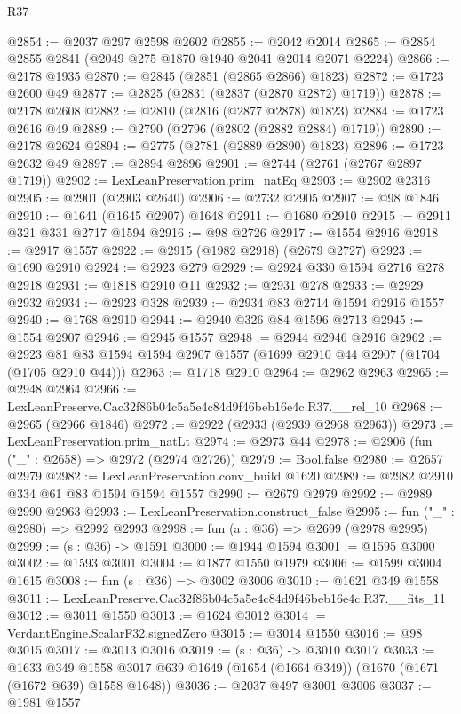 \begin{lexlean}{R37}
\begin{coremodule}
@2854 := @2037 @297 @2598 @2602
@2855 := @2042 @2014
@2865 := @2854 @2855 @2841 (@2049 @275 @1870 @1940 @2041 @2014 @2071 @2224)
@2866 := @2178 @1935
@2870 := @2845 (@2851 (@2865 @2866) @1823)
@2872 := @1723 @2600 @49
@2877 := @2825 (@2831 (@2837 (@2870 @2872) @1719))
@2878 := @2178 @2608
@2882 := @2810 (@2816 (@2877 @2878) @1823)
@2884 := @1723 @2616 @49
@2889 := @2790 (@2796 (@2802 (@2882 @2884) @1719))
@2890 := @2178 @2624
@2894 := @2775 (@2781 (@2889 @2890) @1823)
@2896 := @1723 @2632 @49
@2897 := @2894 @2896
@2901 := @2744 (@2761 (@2767 @2897 @1719))
@2902 := LexLeanPreservation.prim_natEq
@2903 := @2902 @2316
@2905 := @2901 (@2903 @2640)
@2906 := @2732 @2905
@2907 := @98 @1846
@2910 := @1641 (@1645 @2907) @1648
@2911 := @1680 @2910
@2915 := @2911 @321 @331 @2717 @1594
@2916 := @98 @2726
@2917 := @1554 @2916
@2918 := @2917 @1557
@2922 := @2915 (@1982 @2918) (@2679 @2727)
@2923 := @1690 @2910
@2924 := @2923 @279
@2929 := @2924 @330 @1594 @2716 @278 @2918
@2931 := @1818 @2910 @11
@2932 := @2931 @278
@2933 := @2929 @2932
@2934 := @2923 @328
@2939 := @2934 @83 @2714 @1594 @2916 @1557
@2940 := @1768 @2910
@2944 := @2940 @326 @84 @1596 @2713
@2945 := @1554 @2907
@2946 := @2945 @1557
@2948 := @2944 @2946 @2916
@2962 := @2923 @81 @83 @1594 @1594 @2907 @1557 (@1699 @2910 @44 @2907 (@1704 (@1705 @2910 @44)))
@2963 := @1718 @2910
@2964 := @2962 @2963
@2965 := @2948 @2964
@2966 := LexLeanPreserve.Cac32f86b04c5a5e4c84d9f46beb16e4c.R37.__rel_10
@2968 := @2965 (@2966 @1846)
@2972 := @2922 (@2933 (@2939 @2968 @2963))
@2973 := LexLeanPreservation.prim_natLt
@2974 := @2973 @44
@2978 := @2906 (fun ("_" : @2658) => @2972 (@2974 @2726))
@2979 := Bool.false
@2980 := @2657 @2979
@2982 := LexLeanPreservation.conv_build @1620
@2989 := @2982 @2910 @334 @61 @83 @1594 @1594 @1557
@2990 := @2679 @2979
@2992 := @2989 @2990 @2963
@2993 := LexLeanPreservation.construct_false
@2995 := fun ("_" : @2980) => @2992 @2993
@2998 := fun (a : @36) => @2699 (@2978 @2995)
@2999 := (s : @36) -> @1591
@3000 := @1944 @1594
@3001 := @1595 @3000
@3002 := @1593 @3001
@3004 := @1877 @1550 @1979
@3006 := @1599 @3004 @1615
@3008 := fun (s : @36) => @3002 @3006
@3010 := @1621 @349 @1558
@3011 := LexLeanPreserve.Cac32f86b04c5a5e4c84d9f46beb16e4c.R37.__fits_11
@3012 := @3011 @1550
@3013 := @1624 @3012
@3014 := VerdantEngine.ScalarF32.signedZero
@3015 := @3014 @1550
@3016 := @98 @3015
@3017 := @3013 @3016
@3019 := (s : @36) -> @3010 @3017
@3033 := @1633
    @349
    @1558
    @3017
    @639
    @1649
    (@1654 (@1664 @349))
    (@1670 (@1671 (@1672 @639) @1558 @1648))
@3036 := @2037 @497 @3001 @3006
@3037 := @1981 @1557

\end{coremodule}
\end{lexlean}
